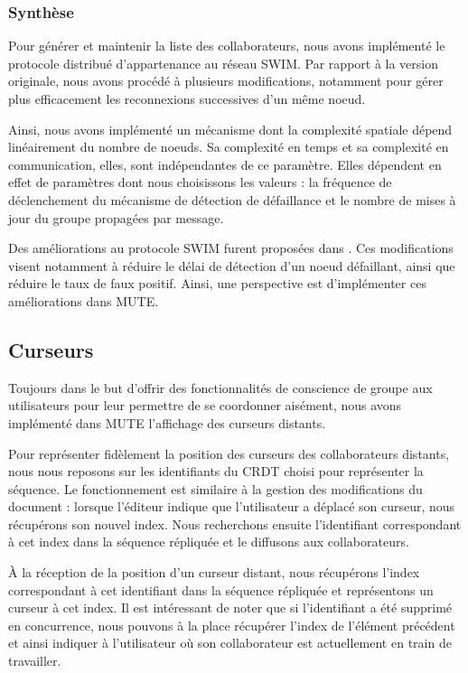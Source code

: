 \documentclass[12pt]{thesul}
\begin{document}
\subsubsection{Synthèse}

Pour générer et maintenir la liste des collaborateurs, nous avons implémenté le protocole distribué d'appartenance au réseau SWIM\cite{swim2002}.
Par rapport à la version originale, nous avons procédé à plusieurs modifications, notamment pour gérer plus efficacement les reconnexions successives d'un même noeud.

Ainsi, nous avons implémenté un mécanisme dont la complexité spatiale dépend linéairement du nombre de noeuds.
Sa complexité en temps et sa complexité en communication, elles, sont indépendantes de ce paramètre.
Elles dépendent en effet de paramètres dont nous choisissons les valeurs : la fréquence de déclenchement du mécanisme de détection de défaillance et le nombre de mises à jour du groupe propagées par message.

Des améliorations au protocole SWIM furent proposées dans \cite{lifeguard2018}.
Ces modifications visent notamment à réduire le délai de détection d'un noeud défaillant, ainsi que réduire le taux de faux positif.
Ainsi, une perspective est d'implémenter ces améliorations dans MUTE.

\subsection{Curseurs}

Toujours dans le but d'offrir des fonctionnalités de conscience de groupe aux utilisateurs pour leur permettre de se coordonner aisément, nous avons implémenté dans MUTE l'affichage des curseurs distants.

Pour représenter fidèlement la position des curseurs des collaborateurs distants, nous nous reposons sur les identifiants du \ac{CRDT} choisi pour représenter la séquence.
Le fonctionnement est similaire à la gestion des modifications du document : lorsque l'éditeur indique que l'utilisateur a déplacé son curseur, nous récupérons son nouvel index.
Nous recherchons ensuite l'identifiant correspondant à cet index dans la séquence répliquée et le diffusons aux collaborateurs.

À la réception de la position d'un curseur distant, nous récupérons l'index correspondant à cet identifiant dans la séquence répliquée et représentons un curseur à cet index.
Il est intéressant de noter que si l'identifiant a été supprimé en concurrence, nous pouvons à la place récupérer l'index de l'élément précédent et ainsi indiquer à l'utilisateur où son collaborateur est actuellement en train de travailler.
\end{document}
